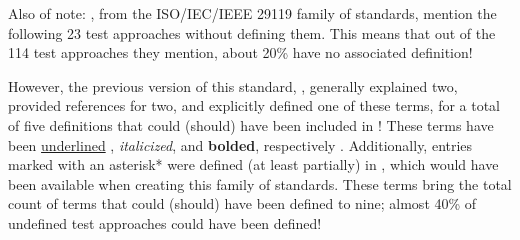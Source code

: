 

\ifnotpaper
    Also of note: \citep{IEEE2022, IEEE2021}, from the
    ISO/IEC/IEEE 29119 family of standards, mention the following 23 test
    approaches without defining them. This means that out of the 114 test
    approaches they mention, about 20\% have no associated definition!

    However, the previous version of this standard, \citeyearpar{IEEE2013},
    generally explained two, provided references for two, and explicitly defined
    one of these terms, for a total of five definitions that could (should) have
    been included in \citeyearpar{IEEE2022}! These terms have been
    \underline{underlined}\ifnotpaper%
        , \emph{italicized}, and \textbf{bolded}, respectively%
    \fi. Additionally, entries marked with an asterisk* were defined (at least
    partially) in \citeyearpar{IEEE2017}, which would have been available when
    creating this family of standards. These terms bring the total count of terms
    that could (should) have been defined to nine; almost 40\% of undefined test
    approaches could have been defined!

